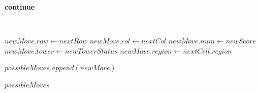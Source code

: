 \documentclass{article}
\begin{document}
\begin{algorithm}[H]
\begin{algorithmic}
    \Else
        \State \textbf{continue}
    \EndIf

    \


        \State $newMove.row \gets nextRow$
        \State $newMove.col \gets nextCol$
        \State $newMove.num \gets newScore$
        \State $newMove.tower \gets newTowerStatus$
        \State $newMove.region \gets nextCell.region$

        \State $possibleMoves.append(newMove)$

    \EndIf

\EndFor

\State \Return $possibleMoves$

\EndFunction

\end{algorithmic}
\end{algorithm}











\end{document}
